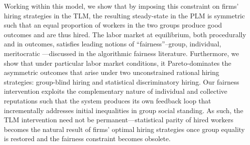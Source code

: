 \documentclass[sigconf]{acmart}
\theoremstyle{definition}
\begin{document}
Working within this model, we show that by imposing this constraint on firms' hiring strategies in the TLM, the resulting steady-state in the PLM is symmetric such that an equal proportion of workers in the two groups produce good outcomes and are thus hired. The labor market at equilibrium, both procedurally and in outcomes, satisfies leading notions of ``fairness''--group, individual, meritocratic \cite{feldman2015certifying, dwork2012fairness, kearns2017meritocratic}---discussed in the algorithmic fairness literature. Furthermore, we show that under particular labor market conditions, it Pareto-dominates the asymmetric outcomes that arise under two unconstrained rational hiring strategies: group-blind hiring and statistical discriminatory hiring. Our fairness intervention exploits the complementary nature of individual and collective reputations such that the system produces its own feedback loop that incrementally addresses initial inequalities in group social standing. As such, the TLM intervention need not be permanent---statistical parity of hired workers becomes the natural result of firms' optimal hiring strategies once group equality is restored and the fairness constraint becomes obsolete.



\end{document}
